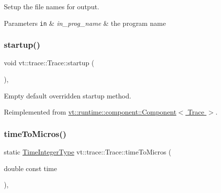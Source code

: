 Setup the file names for output. 


\begin{DoxyParams}[1]{Parameters}
\mbox{\tt in}  & {\em in\+\_\+prog\+\_\+name} & the program name \\
\hline
\end{DoxyParams}
\mbox{\label{structvt_1_1trace_1_1_trace_a5dd8767d9020ebeaba49ea3a684738a1}} 
\subsubsection{\texorpdfstring{startup()}{startup()}}
{\footnotesize\ttfamily void vt\+::trace\+::\+Trace\+::startup (\begin{DoxyParamCaption}{ }\end{DoxyParamCaption})\hspace{0.3cm}{\ttfamily [override]}, {\ttfamily [virtual]}}



Empty default overridden startup method. 



Reimplemented from \hyperlink{structvt_1_1runtime_1_1component_1_1_component_aad3974307ab3b2e1df389a91310f68c2}{vt\+::runtime\+::component\+::\+Component$<$ Trace $>$}.

\mbox{\label{structvt_1_1trace_1_1_trace_a4f271a172e5b1d3bfe7f61d9443b9146}} 
\subsubsection{\texorpdfstring{time\+To\+Micros()}{timeToMicros()}}
{\footnotesize\ttfamily static \hyperlink{structvt_1_1trace_1_1_trace_ab8db9218a8ab87f59773fcbf81433787}{Time\+Integer\+Type} vt\+::trace\+::\+Trace\+::time\+To\+Micros (\begin{DoxyParamCaption}\item[{double const}]{time }\end{DoxyParamCaption})\hspace{0.3cm}{\ttfamily [inline]}, {\ttfamily [static]}}



